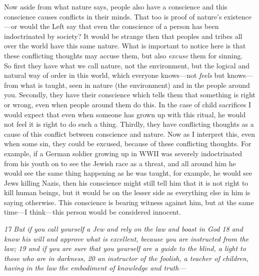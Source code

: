 Now aside from what nature says, people also have a conscience and this
conscience causes conflicts in their minds. That too is proof of
nature's existence---or would the Left say that even the conscience of a
person has been indoctrinated by society? It would be strange then that
peoples and tribes all over the world have this same nature. What is
important to notice here is that these conflicting thoughts may accuse
them, but also \emph{excuse} them for sinning.\\
So first they have what we call nature, not the environment, but the
logical and natural way of order in this world, which everyone
knows---not \emph{feels} but knows---from what is taught, seen in nature
(the environment) and in the people around you. Secondly, they have
their conscience which tells them that something is right or wrong, even
when people around them do this. In the case of child sacrifices I would
expect that even when someone has grown up with this ritual, he would
not feel it is right to do such a thing. Thirdly, they have conflicting
thoughts as a cause of this conflict between conscience and nature. Now
as I interpret this, even when some sin, they could be excused, because
of these conflicting thoughts. For example, if a German soldier growing
up in WWII was severely indoctrinated from his youth on to see the
Jewish race as a threat, and all around him he would see the same thing
happening as he was taught, for example, he would see Jews killing
Nazis, then his conscience might still tell him that it is not right to
kill human beings, but it would be on the lesser side as everything else
in him is saying otherwise. This conscience is bearing witness against
him, but at the same time---I think---this person would be considered
innocent.

\emph{17 But if you call yourself a Jew and rely on the law and boast in
God 18 and know his will and approve what is excellent, because you are
instructed from the law; 19 and if you are sure that you yourself are a
guide to the blind, a light to those who are in darkness, 20 an
instructor of the foolish, a teacher of children, having in the law the
embodiment of knowledge and truth---}

